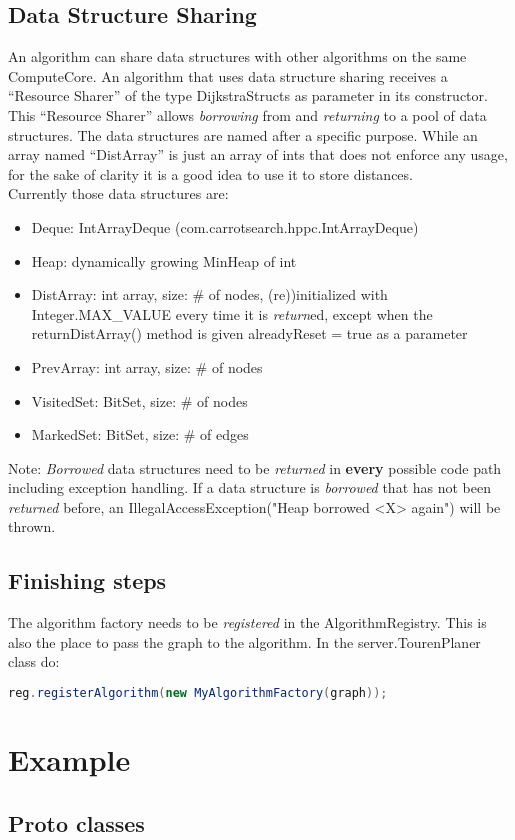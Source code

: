 \documentclass[ngerman,titlepage,parskip=true]{scrartcl}
\begin{document}
  \subsection{Data Structure Sharing}
  An algorithm can share data structures with other algorithms on the same ComputeCore. An algorithm that uses data structure sharing receives a ``Resource Sharer'' of the type DijkstraStructs as parameter in its constructor. This ``Resource Sharer'' allows \textit{borrowing} from and \textit{returning} to a pool of data structures. The data structures are named after a specific purpose. While an array named ``DistArray'' is just an array of ints that does not enforce any usage, for the sake of clarity it is a good idea to use it to store distances.\\
  Currently those data structures are:
  \begin{itemize}
    \item Deque: IntArrayDeque (com.carrotsearch.hppc.IntArrayDeque)
    \item Heap: dynamically growing MinHeap of int
    \item DistArray: int array, size: # of nodes, (re))initialized with Integer.MAX_VALUE every time it is \textit{return}ed, except when the returnDistArray() method is given alreadyReset = true as a parameter
    \item PrevArray: int array, size: # of nodes
    \item VisitedSet: BitSet, size: # of nodes
    \item MarkedSet: BitSet, size: # of edges
  \end{itemize}
  Note: \textit{Borrowed} data structures need to be \textit{returned} in \textbf{every} possible code path including exception handling. If a data structure is \textit{borrowed} that has not been \textit{returned} before, an IllegalAccessException("Heap borrowed <X> again") will be thrown.

  \subsection{Finishing steps}
  The algorithm factory needs to be \textit{registered} in the AlgorithmRegistry. This is also the place to pass the graph to the algorithm.
  In the server.TourenPlaner class do:
  \begin{lstlisting}[language=java,caption=register your algorithm factory]
          reg.registerAlgorithm(new MyAlgorithmFactory(graph));
  \end{lstlisting}
  
  \section{Example}
	 \subsection{Proto classes}
	 
	 
\end{document}
